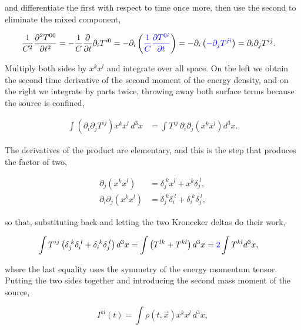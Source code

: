         and differentiate the first with respect to time once more, then use the second to eliminate the mixed component,

        \begin{align*}
            \frac{1}{C^2}\frac{\partial^2 T^{00}}{\partial t^2} &= -\frac{1}{C}\frac{\partial}{\partial t}\partial_iT^{i0} = -\partial_i\left({\color{blue}\frac{1}{C}\frac{\partial T^{0i}}{\partial t}}\right) = -\partial_i\left({\color{blue}-\partial_jT^{ji}}\right) = \partial_i\partial_jT^{ij}.
        \end{align*}

        Multiply both sides by $x^kx^l$ and integrate over all space. On the left we obtain the second time derivative of the second moment of the energy density, and on the right we integrate by parts twice, throwing away both surface terms because the source is confined,

        \begin{align*}
            \int\left(\partial_i\partial_jT^{ij}\right)x^kx^l\,d^3x &= \int T^{ij}\,\partial_i\partial_j\left(x^kx^l\right)d^3x.
        \end{align*}

        The derivatives of the product are elementary, and this is the step that produces the factor of two,

        \begin{align*}
            \partial_j\left(x^kx^l\right) &= \delta_j^{\;k}x^l + x^k\delta_j^{\;l},\\
            \partial_i\partial_j\left(x^kx^l\right) &= \delta_j^{\;k}\delta_i^{\;l} + \delta_i^{\;k}\delta_j^{\;l},
        \end{align*}

        so that, substituting back and letting the two Kronecker deltas do their work,

        \begin{align*}
            \int T^{ij}\left(\delta_j^{\;k}\delta_i^{\;l} + \delta_i^{\;k}\delta_j^{\;l}\right)d^3x &= \int\left(T^{lk} + T^{kl}\right)d^3x = {\color{blue}2}\int T^{kl}d^3x,
        \end{align*}

        where the last equality uses the symmetry of the energy momentum tensor. Putting the two sides together and introducing the second mass moment of the source,

        \begin{equation}\label{eq:MassMoment}
            I^{kl}(t) = \int \rho\left(t,\Vec{x}\right)x^kx^l\,d^3x,
        \end{equation}

